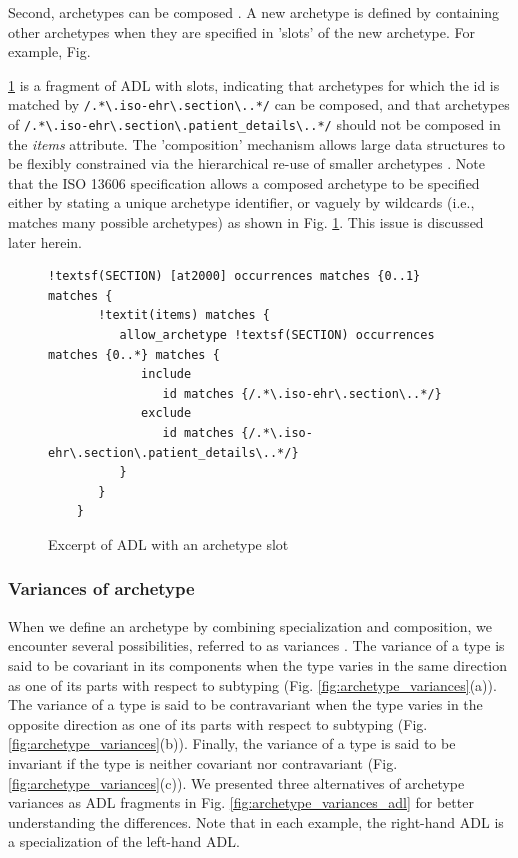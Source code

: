\documentclass[preprint,3p,onecolumn,times,review]{article}
\begin{document}
Second, archetypes can be composed \cite[ix]{iso08:13606_healt_elect_part2}. A new archetype is defined by containing other archetypes when they are specified in 'slots' of the new archetype.
For example, Fig. {\ref{archetype_slot_regex} is a fragment of ADL with slots, indicating that archetypes for which the id is matched by \verb|/.*\.iso-ehr\.section\..*/| can be composed, and that archetypes of \verb|/.*\.iso-ehr\.section\.patient_details\..*/| should not be composed in the {\it{items}} attribute.
The 'composition' mechanism allows large data structures to be flexibly constrained via the hierarchical re-use of smaller archetypes \cite{beale08:_openeh_archit_overv,beale07:_archet_objec_model}.
Note that the ISO 13606 specification allows a composed archetype to be specified either by stating a unique archetype identifier, or vaguely by wildcards (i.e., matches many possible archetypes) \cite[p.61]{beale07:_archet_defin_languag} as shown in Fig. \ref{archetype_slot_regex}. This issue is discussed later herein.


\begin{figure}[!htbp]
\begin{minipage}{1.0\linewidth}
\begin{Verbatim}[frame=single,fontsize=\small, commandchars=!\(\)]
    !textsf(SECTION) [at2000] occurrences matches {0..1} matches {
       !textit(items) matches {
          allow_archetype !textsf(SECTION) occurrences matches {0..*} matches {
             include
                id matches {/.*\.iso-ehr\.section\..*/}
             exclude
                id matches {/.*\.iso-ehr\.section\.patient_details\..*/}
          }
       }
    }
\end{Verbatim}
\end{minipage}
  \caption{Excerpt of ADL with an archetype slot}\label{archetype_slot_regex}
\end{figure}



\subsubsection{Variances of archetype \label{sec:variances_archetype}}

When we define an archetype by combining specialization and composition, we encounter several possibilities, referred to as variances \cite[p.26]{bruce02:_found_objec_orien_languag}\cite{castagna95:_covar}. The variance of a type is said to be covariant in its components when the type varies in the same direction as one of its parts with respect to subtyping (Fig. \ref{fig:archetype_variances}(a)). The variance of a type is said to be contravariant when the type varies in the opposite direction as one of its parts with respect to subtyping (Fig. \ref{fig:archetype_variances}(b)). Finally, the variance of a type is said to be invariant if the type is neither covariant nor contravariant (Fig. \ref{fig:archetype_variances}(c)). 
We presented three alternatives of archetype variances as ADL fragments in Fig. {\ref{fig:archetype_variances_adl}} for better understanding the differences.
Note that in each example, the right-hand ADL is a specialization of the left-hand ADL.


}
\end{document}
